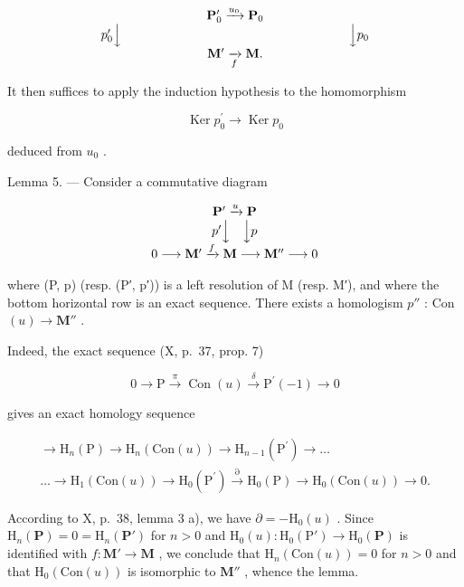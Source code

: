 \[
\begin{array}{c} \mathbf {P} _ {0} ^ {\prime} \xrightarrow {u _ {0}} \mathbf {P} _ {0} \\ p _ {0} ^ {\prime} \Big \downarrow \qquad \qquad \qquad \qquad \qquad \qquad \qquad \qquad \qquad \Big \downarrow p _ {0} \\ \mathbf {M} ^ {\prime} \xrightarrow [ f ]{} \mathbf {M}. \end{array}
\]

It then suffices to apply the induction hypothesis to the homomorphism

\[
\operatorname{Ker} p _ {0} ^ {\prime} \rightarrow \operatorname{Ker} p _ {0}
\]

deduced from \(u_{0}\) .

Lemma 5. --- Consider a commutative diagram

\[
\begin{array}{c} \mathbf {P} ^ {\prime} \xrightarrow {u} \mathbf {P} \\ p ^ {\prime} \Big \downarrow \quad \Big \downarrow p \\ 0 \longrightarrow \mathbf {M} ^ {\prime} \xrightarrow {f} \mathbf {M} \longrightarrow \mathbf {M} ^ {\prime \prime} \longrightarrow 0 \end{array}
\]

where (P, p) (resp. (P′, p′)) is a left resolution of M (resp. M′), and where the bottom horizontal row is an exact sequence. There exists a homologism \(p''\) : Con \((u) \to \mathbf{M}''\) .

Indeed, the exact sequence (X, p.~37, prop. 7)

\[
0 \to \mathrm{P} \xrightarrow {\pi} \operatorname{Con} (u) \xrightarrow {\delta} \mathrm{P} ^ {\prime} (- 1) \to 0
\]

gives an exact homology sequence

\[
\begin{array}{c}\rightarrow \mathrm{H} _ {n} (\mathrm{P}) \rightarrow \mathrm{H} _ {n} (\mathrm{Con} (u)) \rightarrow \mathrm{H} _ {n - 1} (\mathrm{P} ^ {\prime}) \rightarrow \dots\\\dots \rightarrow \mathrm{H} _ {1} (\mathrm{Con} (u)) \rightarrow \mathrm{H} _ {0} (\mathrm{P} ^ {\prime}) \stackrel {{\partial}} {{\rightarrow}} \mathrm{H} _ {0} (\mathrm{P}) \rightarrow \mathrm{H} _ {0} (\mathrm{Con} (u)) \rightarrow 0.\end{array}
\]

According to X, p.~38, lemma 3 a), we have \(\partial = -\mathrm{H}_{0}(u)\) . Since \(\mathrm{H}_{n}(\mathbf{P}) = 0 = \mathrm{H}_{n}(\mathbf{P}')\) for \(n > 0\) and \(\mathrm{H}_{0}(u): \mathrm{H}_{0}(\mathrm{P}') \to \mathrm{H}_{0}(\mathbf{P})\) is identified with \(f: \mathbf{M}' \to \mathbf{M}\) , we conclude that \(\mathrm{H}_{n}(\mathrm{Con}(u)) = 0\) for \(n > 0\) and that \(\mathrm{H}_{0}(\mathrm{Con}(u))\) is isomorphic to \(\mathbf{M}''\) , whence the lemma.

